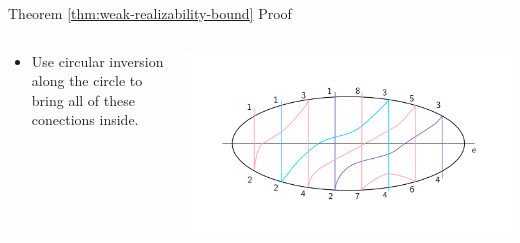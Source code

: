 \documentclass[10pt,aspectratio=169]{beamer}
\theoremstyle{plain}
\begin{document}
\begin{frame}{Theorem \ref{thm:weak-realizability-bound} Proof}
    \begin{columns}
    \begin{column}{0.35\textwidth}
        \begin{itemize}
            \item Use circular inversion along the circle to bring all of these conections inside.
        \end{itemize}
    \end{column}
    \begin{column}{0.65\textwidth}
        \begin{center}
            \includegraphics[width=\textwidth]{images/figure-7.pdf}
        \end{center}
    \end{column}
    \end{columns}
\end{frame}
\end{document}
